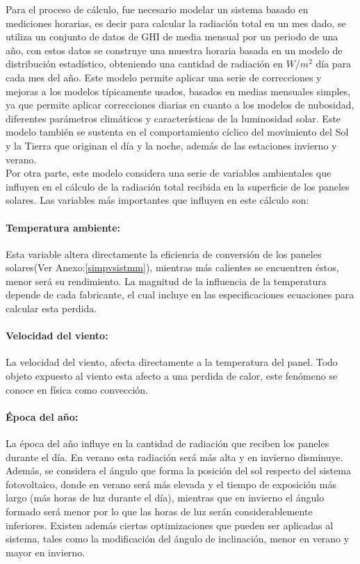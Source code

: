 Para el proceso de cálculo, fue necesario modelar un sistema basado en mediciones horarias, es decir para calcular la radiación total en un mes dado, se utiliza un conjunto de datos de GHI de media mensual por un periodo de una año, con estos datos se construye una muestra horaria basada en un modelo de distribución estadístico, obteniendo una cantidad de radiación en $W/m^2$ día para cada mes del año. Este modelo permite aplicar una serie de correcciones y mejoras a los modelos típicamente usados, basados en medias mensuales simples, ya que permite aplicar correcciones diarias en cuanto a los modelos de nubosidad, diferentes parámetros climáticos y características de la luminosidad solar. Este modelo también se sustenta en el comportamiento cíclico del movimiento del Sol y la Tierra que originan el día y la noche, además de las estaciones invierno y verano.\\

Por otra parte, este modelo considera una serie de variables ambientales que influyen en el cálculo de la radiación total recibida en la superficie de los paneles solares. Las variables más importantes que influyen en este cálculo son:

\paragraph{Temperatura ambiente:}
Esta variable altera directamente la eficiencia de conversión de los paneles solares(Ver Anexo:\ref{simpvsistmm}), mientras más calientes se encuentren éstos, menor será su rendimiento. La magnitud de la influencia de la temperatura depende de cada fabricante, el cual incluye en las especificaciones ecuaciones para calcular esta perdida.

\paragraph{Velocidad del viento:}
La velocidad del viento, afecta directamente a la temperatura del panel. Todo objeto expuesto al viento esta afecto a una perdida de calor, este fenómeno se conoce en física como convección. 

\paragraph{Época del año:}
La época del año influye en la cantidad de radiación que reciben los paneles durante el día. En verano esta radiación será más alta y en invierno disminuye. Además, se considera el ángulo que forma la posición del sol respecto del sistema fotovoltaico, donde en verano será más elevada y el tiempo de exposición más largo (más horas de luz durante el día), mientras que en invierno el ángulo formado será menor por lo que las horas de luz serán considerablemente inferiores. Existen además ciertas optimizaciones que pueden ser aplicadas al sistema, tales como la modificación del ángulo de inclinación, menor en verano y mayor en invierno.

